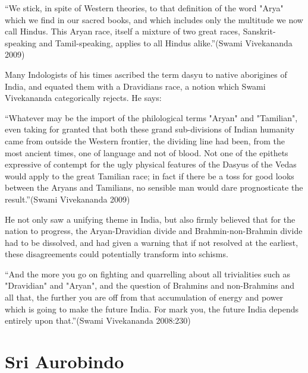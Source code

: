\begin{myquote}
“We stick, in spite of Western theories, to that definition of the word "Arya" which we find in our sacred books, and which includes only the multitude we now call Hindus. This Aryan race, itself a mixture of two great races, Sanskrit-speaking and Tamil-speaking, applies to all Hindus alike.”(Swami Vivekananda 2009)
\end{myquote}

Many Indologists of his times ascribed the term dasyu to native aborigines of India, and equated them with a Dravidians race, a notion which Swami Vivekananda categorically rejects. He says:

\begin{myquote}
“Whatever may be the import of the philological terms "Aryan" and "Tamilian", even taking for granted that both these grand sub-divisions of Indian humanity came from outside the Western frontier, the dividing line had been, from the most ancient times, one of language and not of blood. Not one of the epithets expressive of contempt for the ugly physical features of the Dasyus of the Vedas would apply to the great Tamilian race; in fact if there be a toss for good looks between the Aryans and Tamilians, no sensible man would dare prognosticate the result.”(Swami Vivekananda 2009)
\end{myquote}

He not only saw a unifying theme in India, but also firmly believed that for the nation to progress, the Aryan-Dravidian divide and Brahmin-non-Brahmin divide had to be dissolved, and had given a warning that if not resolved at the earliest, these disagreements could potentially transform into schisms.

\begin{myquote}
“And the more you go on fighting and quarrelling about all trivialities such as "Dravidian" and "Aryan", and the question of Brahmins and non-Brahmins and all that, the further you are off from that accumulation of energy and power which is going to make the future India. For mark you, the future India depends entirely upon that.”(Swami Vivekananda 2008:230)
\end{myquote}


\section*{Sri Aurobindo}

